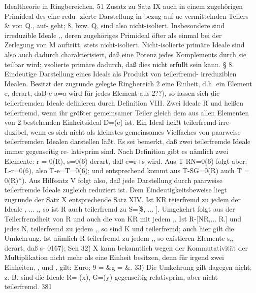 \documentclass[11pt,a4paper]{article}
\theoremstyle{plain}
\theoremstyle{definition}
\begin{document}
Idealtheorie in Ringbereichen. 
51 
Zusatz zu Satz IX auch in einem zugehörigen Primideal 
des eine redu- 
zierte Darstellung in bezug auf ue vermittelnden Teilers \& von Q., auf- 
geht; 8, bzw. Q, sind also nicht-isoliert. 
Insbesondere 
sind 
irreduzible 
Ideale ,, deren zugehöriges Primideal öfter als einmal bei der Zerlegung 
von M auftritt, stets nicht-isoliert. 
Nicht-isolierte 
primäre Ideale sind 
also auch dadurch 
charakterisiert, daß eine Potenz 
jedes Komplements 
durch sie teilbar wird; vsolierte primäre dadurch, daß dies nicht erfüllt 
sein kann. 
\S{} 8. 
Eindeutige Darstellung eines Ideals als Produkt von teilerfremd- 
irreduziblen Idealen. 
Besitzt 
der zugrunde 
gelegte Ringbereich 2 eine Einheit, d.h. ein 
Element 
e, derart, 
daB e-a=a 
wird für jedes Element aus 2\textdegree{}??), 
so 
lassen sich die teilerfremden Ideale definieren durch 
Definition VIII. Zwei Ideale 
R und  heißen teilerfremd, wenn 
ihr größter gemeinsamer Teiler gleich dem aus allen Elementen von 2 
bestehenden Einheitsideal 
D=(e) ist. 
Ein Ideal heißt teilerfremd-irre- 
duzibel, wenn 
es sich 
nicht als kleinstes gemeinsames Vielfaches 
von 
paarweise teilerfremden Idealen darstellen läßt. 
Es sei bemerkt, daß zwei teilerfremde Ideale immer gegenseitig re- 
lativprim sind. 
Nach Definition gibt es nämlich zwei Elemente: r = 0(R), 
s=0(6) 
derart, daß 
e=r+s 
wird. 
Aus T-RN=0(6) 
folgt aber: 
L-r=0(6), 
also T-e=T=0(6); 
und entsprechend 
kommt 
aus 
T-SG=0(R) auch T = 0(R)*). 
Aus Hilfssatz V folgt also, daß jede 
Darstellung durch paarweise teilerfremde Ideale zugleich reduziert ist. 
Dem Eindeutigkeitsbeweise liegt zugrunde der Satz X entsprechende 
Satz XIV. 
Ist KR teierfremd 
zu jedem der Ideale , ... ,, so 
ist R auch teilerfremd zu 
S=[\$, ... ]. 
Umgekehrt 
folgt aus 
der 
Teilerfremdheit von R und  auch die von 
KR mit jedem ,. 
Ist 
R-[NR,... R.] und jedes N, teilerfremd zu jedem ,, so sind K und 
 teilerfremd; auch hier gilt die Umkehrung. 
Ist nämlich R teilerfremd 
zu jedem ,, so existieren Elemente s,, 
derart, daß 
s- 0167); 
Sen 
32) X kann bekanntlich wegen der Kommutativität 
der Multiplikation 
nicht 
mehr 
als eine Einheit 
besitzen, 
denn für irgend zwei Einheiten, 
\guillemotleft{}, und \guillemotleft{}, gilt: 
Euro; 9 = \&g = \&. 
33) Die Umkehrung gilt dagegen nicht; z. B. sind 
die Ideale R= (x), G=(y) 
gegenseitig relativprim, aber nicht teilerfremd. 
381
\end{document}
